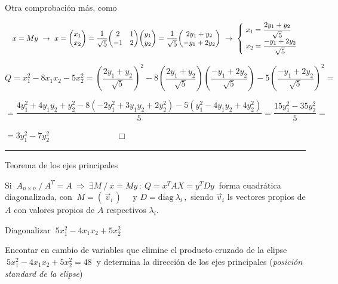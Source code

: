 Otra comprobación más, como 

$ \quad x=My \ \to \  x=  \mqty(x_1 \\ x_2)= \dfrac 1{\sqrt{5}} \mqty(2&1\\-1&2) \mqty(y_1\\y_2) =  \dfrac 1{\sqrt{5}} \mqty( 2y_1+y_2 \\  -y_1+2y_2) \ \to \ \begin{cases} \ x_1= \dfrac{2y_1+y_2}{\sqrt{5}} \\ \ x_2=\dfrac{-y_1+2y_2}{\sqrt{5}} \end{cases}$

$Q=x_1^2-8x_1x_2-5x_2^2= \left( \dfrac{2y_1+y_2}{\sqrt{5}} \right)^2 - 8 \left( \dfrac{2y_1+y_2}{\sqrt{5}} \right) \left( \dfrac{-y_1+2y_2}{\sqrt{5}} \right)-5 \left( \dfrac{-y_1+2y_2}{\sqrt{5}} \right)^2=$

$=\dfrac{4y_1^2+4y_1y_2+y_2^2-8(-2y_1^2+3y_1y_2+2y_2^2)-5(y_1^2-4y_1y_2+4y_2^2)}{5}=\dfrac{15y_1^2-35y_2^2}{5}=$

$=3y_1^2-7y_2^2 \qquad \qquad \qquad \qquad  \Box$

\begin{center}
	\rule{200pt}{0.1pt}
\end{center}

\color{black}

\vspace{15mm}
\begin{large}
\begin{myblock}{Teorema de los ejes principales}
\vspace{2mm}

Si $\ A_{n\times n} \ / \ A^T=A \ \Rightarrow \ \exists M \ / \ x=My \, : \ Q=x^TAX=y^TDy\ $ forma cuadrática diagonalizada, con $\ M=(\, \vec v_i \, ) \quad \text{ y } D=\text{diag}\ \lambda_i\, , $ siendo  $\vec v_i$ ls vectores propios de $A$ con valores propios de $A$ respectivos $\lambda_i$.

\vspace{2mm}	
\end{myblock}
\end{large}

\vspace{15mm} 

\begin{cuadro-gris}
Diagonalizar $\ 5x_1^2-4x_1x_2+5x_2^2$	

\vspace{2mm} Encontar en cambio de variables que elimine el producto cruzado de la elipse $\ 5x_1^2-4x_1x_2+5x_2^2=48\ $ y determina la dirección de los ejes principales (\emph{posición standard de la elipse})	
\end{cuadro-gris}

